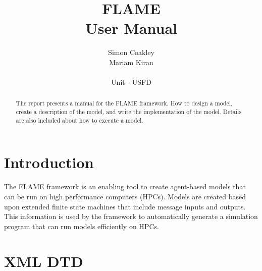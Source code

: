 \documentclass[12pt,a4paper]{article}
\begin{document}
\title{FLAME
\\User Manual}
\author{Simon Coakley\\Mariam Kiran
\\
\\ Unit - USFD}

\maketitle



\begin{abstract}
The report presents a manual for the FLAME framework. How to design a model,
create a description of the model, and write the implementation of the model.
Details are also included about how to execute a model.
\end{abstract}

\pagebreak
\tableofcontents
\pagebreak

\section{Introduction}

The FLAME framework is an enabling tool to create agent-based models that can
be run on high performance computers (HPCs). Models are created based upon
extended finite state machines that include message inputs and outputs. This information
is used by the framework to automatically generate a simulation program that
can run models efficiently on HPCs.






\appendix

\section{XML DTD}                       %
\label{cha_xmldtd}

\small{{\tt }}


%
%
\end{document}
